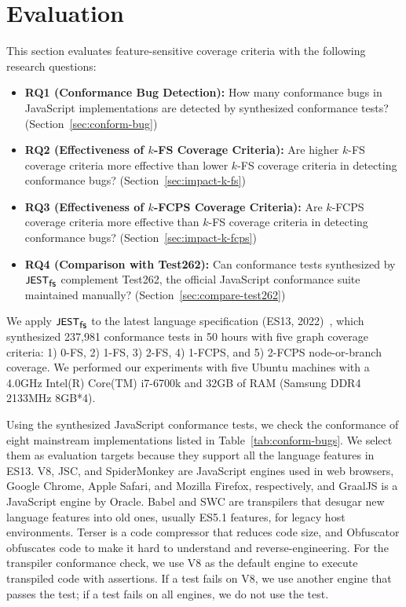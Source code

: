 \documentclass[acmsmall,review,screen]{acmart}
\newcommand{\name}[1]{\textsf{#1}}
\newcommand{\sname}[1]{\name{\small #1}}
\newcommand{\jest}{\sname{JEST}}
\newcommand{\tool}{\jest_{\sname{fs}}}
\begin{document}
\section{Evaluation}\label{sec:eval}
This section evaluates feature-sensitive coverage criteria with the following research questions:
\begin{itemize}
  \item \textbf{RQ1 (Conformance Bug Detection):} How many conformance bugs
 in JavaScript implementations are detected by synthesized conformance tests?
    (Section~\ref{sec:conform-bug})
  \item \textbf{RQ2 (Effectiveness of $k$-FS Coverage Criteria):} Are higher $k$-FS
    coverage criteria more effective than lower $k$-FS coverage
    criteria in detecting conformance bugs? (Section~\ref{sec:impact-k-fs})
  \item \textbf{RQ3 (Effectiveness of $k$-FCPS Coverage Criteria):} Are $k$-FCPS
    coverage criteria more effective than $k$-FS coverage criteria in detecting
    conformance bugs? (Section~\ref{sec:impact-k-fcps})
  \item \textbf{RQ4 (Comparison with Test262):} Can conformance tests
    synthesized by $\tool$ complement Test262, the official JavaScript conformance
    suite maintained manually? (Section~\ref{sec:compare-test262})
\end{itemize}

We apply $\tool$ to the latest language specification (ES13, 2022)~\cite{es13},
which synthesized 237,981 conformance tests in 50 hours with
five graph coverage criteria: 1) 0-FS, 2) 1-FS, 3) 2-FS, 4) 1-FCPS,
and 5) 2-FCPS node-or-branch coverage.
We performed our experiments with five Ubuntu machines with a 4.0GHz Intel(R)
Core(TM) i7-6700k and 32GB of RAM (Samsung DDR4 2133MHz 8GB*4).


Using the synthesized JavaScript conformance tests, we check the conformance of
eight mainstream implementations listed in Table~\ref{tab:conform-bugs}.
We select them as evaluation targets because they support all the language
features in ES13.
V8, JSC, and SpiderMonkey are JavaScript engines used in web browsers, Google
Chrome, Apple Safari, and Mozilla Firefox, respectively, and
GraalJS is a JavaScript engine by Oracle.
Babel and SWC are transpilers that desugar new language features into old ones,
usually ES5.1 features, for legacy host environments.
Terser is a code compressor that reduces code size, and
Obfuscator obfuscates code to make it hard to understand and reverse-engineering.
For the transpiler conformance check, we use V8 as the default engine
to execute transpiled code with assertions.
If a test fails on V8, we use another engine that passes the test;
if a test fails on all engines, we do not use the test.
\end{document}
